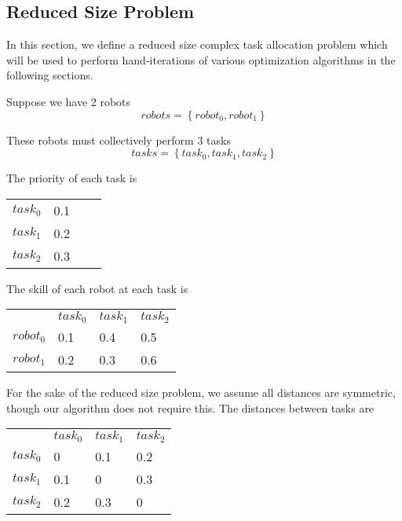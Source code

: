 \documentclass[a4paper]{article}
\begin{document}
\subsection{Reduced Size Problem}



In this section, we define a reduced size complex task allocation problem which
will be used to perform hand-iterations of various optimization algorithms in
the following sections.

Suppose we have 2 robots
$$\mathit{robots} = \left\{ \mathit{robot}_0, \mathit{robot}_1 \right\}$$

These robots must collectively perform 3 tasks
$$\mathit{tasks} = \left\{ \mathit{task}_0, \mathit{task}_1,  \mathit{task}_2 \right\}$$

The priority of each task is

\begin{tabular}{llll}
$\mathit{task}_0$  & 0.1 \\
$\mathit{task}_1$  & 0.2 \\
$\mathit{task}_2$  & 0.3 \\
\end{tabular}
\vspace{1.5em}

The skill of each robot  at each task is

\begin{tabular}{llll}
                   & $\mathit{task}_0$ & $\mathit{task}_1$ & $\mathit{task}_2$ \\
$\mathit{robot}_0$ & 0.1               & 0.4               & 0.5               \\
$\mathit{robot}_1$ & 0.2               & 0.3               & 0.6               \\
\end{tabular}
\vspace{1.5em}

For the sake of the reduced size problem, we assume all distances are symmetric, though our algorithm does not require this. The distances between tasks are

\begin{tabular}{llll}
                   & $\mathit{task}_0$ & $\mathit{task}_1$ & $\mathit{task}_2$ \\
$\mathit{task}_0$  & 0                 & 0.1               & 0.2               \\
$\mathit{task}_1$  & 0.1               & 0                 & 0.3               \\
$\mathit{task}_2$  & 0.2               & 0.3               & 0                 \\
\end{tabular}
\vspace{1.5em}
\end{document}
